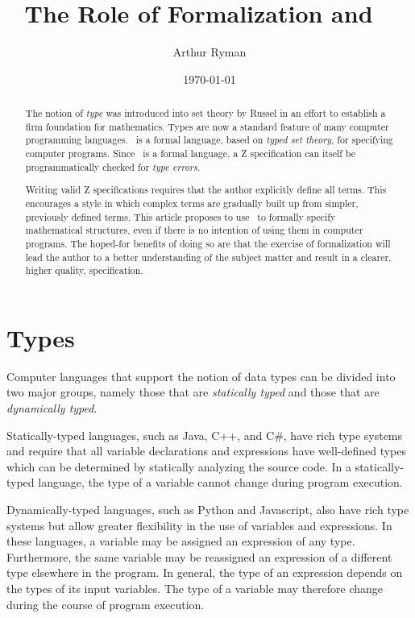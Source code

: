 \documentclass{amsart}
\begin{document}
\title{The Role of Formalization and \ZN\ }
\author{Arthur Ryman}
\date{\today}

\begin{abstract}
The notion of {\it type} was introduced into set theory by Russel in an effort to establish a firm foundation for mathematics.
Types are now a standard feature of many computer programming languages.
\ZN\  is a formal language, based on \textit{typed set theory}, for specifying computer programs.
Since \ZN\  is a formal language, a Z specification can itself be programmatically checked for 
\textit{type errors}.

Writing valid Z specifications requires that the author explicitly define all terms.
This encourages a style in which complex terms are gradually built up from simpler, previously defined terms.
This article proposes to use \ZN\  to formally specify mathematical structures, even if there is no intention of using
them in computer programs.
The hoped-for benefits of doing so are that the exercise of formalization will lead the author to a better understanding of the subject
matter and result in a clearer, higher quality, specification.
\end{abstract}

\maketitle

\tableofcontents

\section{Types}

Computer languages that support the notion of data types
can be divided into two major groups, namely those that are 
\textit{statically typed} and those that are \textit{dynamically typed}.

Statically-typed languages, such as Java, C++, and C\#, have rich type systems and require that all 
variable declarations and expressions have well-defined types which can be determined by statically analyzing
the source code. In a statically-typed language, the type of a variable cannot change during program execution.

Dynamically-typed languages, such as Python and Javascript, also have rich type systems but allow greater flexibility in the use of variables and expressions.
In these languages, a variable may be assigned an expression of any type.
Furthermore, the same variable may be reassigned an expression of a different type elsewhere
in the program.
In general, the type of an expression depends on the types of its input variables.
The type of a variable may therefore change during the course of program execution.
\end{document}
